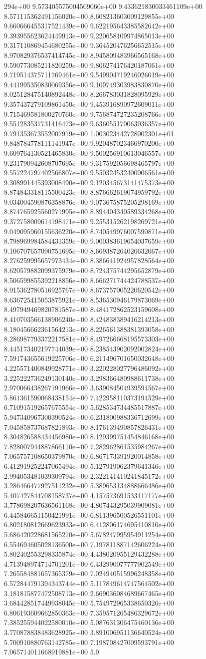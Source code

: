 294e+00	9.573405575004509060e+00	9.433621830033461109e+00	8.571115362491156020e+00	8.608213603009129855e+00	9.660666455317521439e+00	9.622195643385582642e+00	9.393955623624449913e+00	9.220658109974865013e+00	9.317110869454680255e+00	9.364520476256652515e+00	8.970829376537414745e+00	8.945809483966565168e+00	9.590773085211820259e+00	9.806274176420187061e+00	9.719514375711769461e+00	9.549904719246026019e+00	9.441995350830069356e+00	9.109749303983830870e+00	8.025128475140892448e+00	8.266783031828095929e+00	9.357437279109861450e+00	9.453916890972609011e+00	9.715469581800270760e+00	9.756874727235208766e+00	9.551283537731416473e+00	9.636055170063036357e+00	9.791353673552007919e+00	1.003023442728002301e+01	9.848784778111141947e+00	9.920487023466970200e+00	9.609764130521465830e+00	9.500256910613046557e+00	9.231790942608707695e+00	9.317592056698465797e+00	9.557224797402566807e+00	9.550324532400006561e+00	9.308991445393008490e+00	9.120345673141475373e+00	8.874843318115500423e+00	8.876662619074959792e+00	9.034004590876358876e+00	9.073675875205298169e+00	8.874765925560271995e+00	8.894404340589334268e+00	9.372758009614198471e+00	9.255315262198269721e+00	9.049095960155636220e+00	8.740549976007590871e+00	8.798969984584431359e+00	9.000383619654037659e+00	9.106707657090751695e+00	8.669387264026632067e+00	8.276259995657973434e+00	8.386641924957828564e+00	8.620579882099375979e+00	8.724375744295652879e+00	8.506599855392218856e+00	8.666271744424788537e+00	8.915362780516925767e+00	8.673757005220620542e+00	8.636725415053875921e+00	8.536530946179873069e+00	8.497949469820781587e+00	8.484172862523159608e+00	8.410703566138906240e+00	8.424838389416214213e+00	8.180456662361564213e+00	8.226561388381393058e+00	8.286987793372217581e+00	8.497266668195573303e+00	8.445173402197744039e+00	8.238543902092002824e+00	7.591743655619225706e+00	6.211496701650032648e+00	4.225571400849928771e+00	3.220228027796486092e+00	3.225222736249130140e+00	3.298366480988611738e+00	2.970066438267191966e+00	3.639084504939594567e+00	5.861361590068438154e+00	7.422958110373194529e+00	6.710915192657675554e+00	5.628534734485517887e+00	5.947340967300390524e+00	6.231800988336712699e+00	7.045858737687821893e+00	8.176139490857826431e+00	8.304826588434456980e+00	8.129399751454846168e+00	7.828007944887866110e+00	7.282962861535984267e+00	7.065757108650379870e+00	6.867173391920014858e+00	6.412919252247065494e+00	5.127919062379641346e+00	2.994053481039309794e+00	2.322141410241845172e+00	3.286466477927511232e+00	5.389653134888666486e+00	5.407427844708158737e+00	4.157573691533117177e+00	3.778698207636561168e+00	4.807443295039909081e+00	6.445846651150421991e+00	6.811396500526551101e+00	6.802180812669623933e+00	6.412806174695410810e+00	5.686420228681565270e+00	5.678247995954911254e+00	6.554694605028136500e+00	7.197811887142606224e+00	5.802402553298335874e+00	4.438020955129432288e+00	4.713948974714701201e+00	6.432990077777902549e+00	7.265584881657365379e+00	7.024940515996248358e+00	6.572844791394343744e+00	5.117849614747564502e+00	3.181815877472508713e+00	2.669036084689667465e+00	3.684428517449938045e+00	5.754972965338650326e+00	6.806193609662850363e+00	7.359571265486329672e+00	7.385255944022580010e+00	5.087631306475460136e+00	3.770878838483628925e+00	3.891006951136640524e+00	5.700910880763142785e+00	7.198708427009593791e+00	7.065714011668919881e+00	5.9